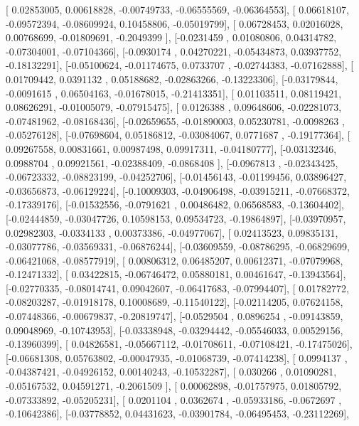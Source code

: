 \documentclass{article}
\begin{document}
       [ 0.02853005,  0.00618828, -0.00749733, -0.06555569, -0.06364553],
       [ 0.06618107, -0.09572394, -0.08609924,  0.10458806, -0.05019799],
       [ 0.06728453,  0.02016028,  0.00768699, -0.01809691, -0.2049399 ],
       [-0.0231459 ,  0.01080806,  0.04314782, -0.07304001, -0.07104366],
       [-0.0930174 ,  0.04270221, -0.05434873,  0.03937752, -0.18132291],
       [-0.05100624, -0.01174675,  0.0733707 , -0.02744383, -0.07162888],
       [ 0.01709442,  0.0391132 ,  0.05188682, -0.02863266, -0.13223306],
       [-0.03179844, -0.0091615 ,  0.06504163, -0.01678015, -0.21413351],
       [ 0.01103511,  0.08119421,  0.08626291, -0.01005079, -0.07915475],
       [ 0.0126388 ,  0.09648606, -0.02281073, -0.07481962, -0.08168436],
       [-0.02659655, -0.01890003,  0.05230781, -0.0098263 , -0.05276128],
       [-0.07698604,  0.05186812, -0.03084067,  0.0771687 , -0.19177364],
       [ 0.09267558,  0.00831661,  0.00987498,  0.09917311, -0.04180777],
       [-0.03132346,  0.0988704 ,  0.09921561, -0.02388409, -0.0868408 ],
       [-0.0967813 , -0.02343425, -0.06723332, -0.08823199, -0.04252706],
       [-0.01456143, -0.01199456,  0.03896427, -0.03656873, -0.06129224],
       [-0.10009303, -0.04906498, -0.03915211, -0.07668372, -0.17339176],
       [-0.01532556, -0.0791621 ,  0.00486482,  0.06568583, -0.13604402],
       [-0.02444859, -0.03047726,  0.10598153,  0.09534723, -0.19864897],
       [-0.03970957,  0.02982303, -0.0334133 ,  0.00373386, -0.04977067],
       [ 0.02413523,  0.09835131, -0.03077786, -0.03569331, -0.06876244],
       [-0.03609559, -0.08786295, -0.06829699, -0.06421068, -0.08577919],
       [ 0.00806312,  0.06485207,  0.00612371, -0.07079968, -0.12471332],
       [ 0.03422815, -0.06746472,  0.05880181,  0.00461647, -0.13943564],
       [-0.02770335, -0.08014741,  0.09042607, -0.06417683, -0.07994407],
       [ 0.01782772, -0.08203287, -0.01918178,  0.10008689, -0.11540122],
       [-0.02114205,  0.07624158, -0.07448366, -0.00679837, -0.20819747],
       [-0.0529504 ,  0.0896254 , -0.09143859,  0.09048969, -0.10743953],
       [-0.03338948, -0.03294442, -0.05546033,  0.00529156, -0.13960399],
       [ 0.04826581, -0.05667112, -0.01708611, -0.07108421, -0.17475026],
       [-0.06681308,  0.05763802, -0.00047935, -0.01068739, -0.07414238],
       [ 0.0994137 , -0.04387421, -0.04926152,  0.00140243, -0.10532287],
       [ 0.030266  ,  0.01090281, -0.05167532,  0.04591271, -0.2061509 ],
       [ 0.00062898, -0.01757975,  0.01805792, -0.07333892, -0.05205231],
       [ 0.0201104 ,  0.0362674 , -0.05933186, -0.0672697 , -0.10642386],
       [-0.03778852,  0.04431623, -0.03901784, -0.06495453, -0.23112269],
\end{document}
